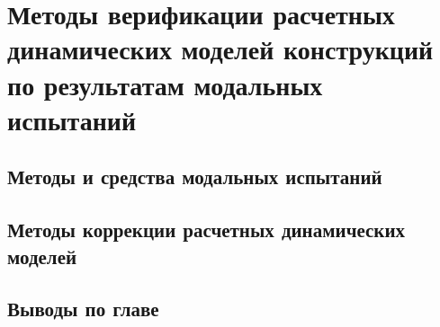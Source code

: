 \chapter{Методы верификации расчетных динамических моделей конструкций по результатам модальных испытаний}

\section{Методы и средства модальных испытаний}


\section{Методы коррекции расчетных динамических моделей} 

\section{Выводы по главе \thechapter}